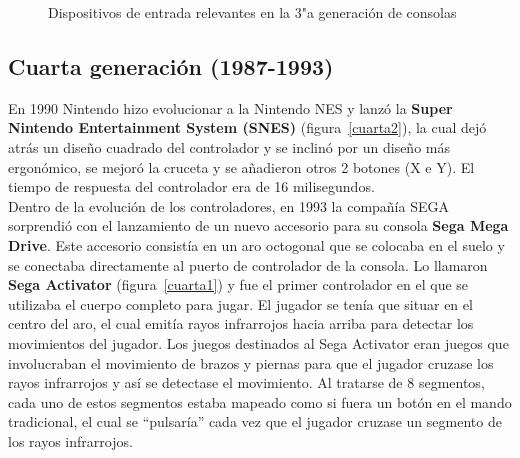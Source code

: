 \begin{figure}[t]
     \hfill
     \caption{Dispositivos de entrada relevantes en la 3"a  generaci\'on de consolas}
     \label{fig:tercera}
   \end{figure}


\subsection{Cuarta generaci\'on (1987-1993)}


En 1990 Nintendo hizo evolucionar a la Nintendo NES y lanz\'o la \textbf{Super Nintendo Entertainment System (SNES)} (figura~\ref{cuarta2}), la cual dej\'o atr\'as un dise\~no cuadrado del controlador y se inclin\'o por un dise\~no m\'as ergon\'omico, se mejor\'o la cruceta y se a\~nadieron otros 2 botones (X e Y). El tiempo de respuesta del controlador era de 16 milisegundos. \\

Dentro de la evoluci\'on de los controladores, en 1993 la compa\~n\'ia SEGA sorprendi\'o con el lanzamiento de un nuevo accesorio para su consola \textbf{Sega Mega Drive}. Este accesorio consist\'ia en un aro octogonal que se colocaba en el suelo y se conectaba directamente al puerto de controlador de la consola. Lo llamaron \textbf{Sega Activator} (figura~\ref{cuarta1}) y fue el primer controlador en el que se utilizaba el cuerpo completo para jugar. El jugador se ten\'ia que situar en el centro del aro, el cual emit\'ia rayos infrarrojos hacia arriba para detectar los movimientos del jugador. Los juegos destinados al Sega Activator eran juegos que involucraban el movimiento de brazos y piernas para que el jugador cruzase los rayos infrarrojos y as\'i se detectase el movimiento. Al tratarse de 8 segmentos, cada uno de estos segmentos estaba mapeado como si fuera un bot\'on en el mando tradicional, el cual se ``pulsar\'ia'' cada vez que el jugador cruzase un segmento de los rayos infrarrojos. \\

